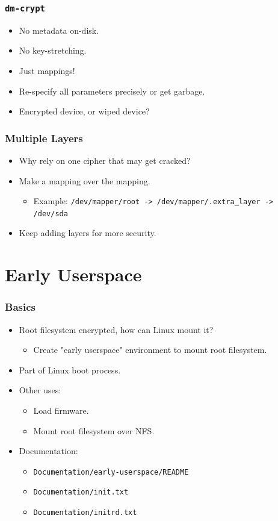 \documentclass[xcolor={dvipsnames,svgnames},hyperref=dvips]{beamer}
\begin{document}
	\begin{frame}
		\frametitle{\texttt{dm-crypt}}
		\begin{itemize}
		\item No metadata on-disk.
		\item No key-stretching.
		\item Just mappings!
		\item Re-specify all parameters precisely or get garbage.
		\item Encrypted device, or wiped device?
		\end{itemize}
	\end{frame}

	\begin{frame}
		\frametitle{Multiple Layers}
		\begin{itemize}
		\item Why rely on one cipher that may get cracked?
		\item Make a mapping over the mapping.
			\begin{itemize}
			\item Example: \texttt{/dev/mapper/root -> /dev/mapper/.extra\_layer -> /dev/sda}
			\end{itemize}
		\item Keep adding layers for more security.
		\end{itemize}
	\end{frame}

\section{Early Userspace}\label{section:hell}
	\begin{frame}
		\frametitle{Basics}
		\begin{itemize}
		\item Root filesystem encrypted, how can Linux mount it?
			\begin{itemize}
			\item Create "early userspace" environment to mount root filesystem.
			\end{itemize}
		\item Part of Linux boot process.
		\item Other uses:
			\begin{itemize}
			\item Load firmware.
			\item Mount root filesystem over NFS.
			\end{itemize}
		\item Documentation:
			\begin{itemize}
			\item \texttt{Documentation/early-userspace/README}
			\item \texttt{Documentation/init.txt}
			\item \texttt{Documentation/initrd.txt}
			\end{itemize}
		\end{itemize}
	\end{frame}
\end{document}
